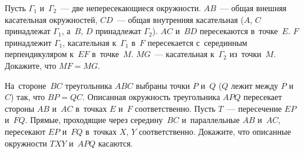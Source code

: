 \begin{problems}
\item
Пусть $\Gamma_1$ и~$\Gamma_2$~--- две непересекающиеся окружности.
$AB$~--- общая внешняя касательная окружностей,
$CD$~--- общая внутренняя касательная
($A$, $C$ принадлежат $\Gamma_1$, а~$B$, $D$ принадлежат $\Gamma_2$).
$AC$ и~$BD$ пересекаются в~точке~$E$.
$F$ принадлежит $\Gamma_1$, касательная к~$\Gamma_1$ в~$F$ пересекается
с~серединным перпендикуляром к~$EF$ в~точке~$M$.
$MG$~--- касательная к~$\Gamma_2$ из~точки~$M$.
Докажите, что $MF = MG$.

\item
На~стороне~$BC$ треугольника $ABC$ выбраны точки $P$ и~$Q$
($Q$ лежит между $P$ и~$C$) так, что $BP = QC$.
Описанная окружность треугольника $APQ$ пересекает стороны $AB$ и~$AC$
в~точках $E$ и~$F$ соответственно.
Пусть $T$~--- пересечение $EP$ и~$FQ$.
Прямые, проходящие через середину~$BC$ и~параллельные $AB$ и~$AC$, пересекают
$EP$ и~$FQ$ в~точках $X$, $Y$ соответственно.
Докажите, что описанные окружности $TXY$ и~$APQ$ касаются.

\end{problems}

